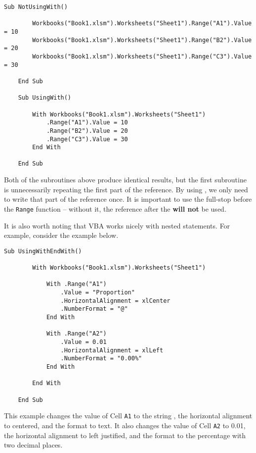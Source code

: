 \documentclass[11pt]{article}%
\begin{document}
\begin{lstlisting}[style=A]
    Sub NotUsingWith()

        Workbooks("Book1.xlsm").Worksheets("Sheet1").Range("A1").Value = 10
        Workbooks("Book1.xlsm").Worksheets("Sheet1").Range("B2").Value = 20
        Workbooks("Book1.xlsm").Worksheets("Sheet1").Range("C3").Value = 30

    End Sub

    Sub UsingWith()

        With Workbooks("Book1.xlsm").Worksheets("Sheet1")
            .Range("A1").Value = 10
            .Range("B2").Value = 20
            .Range("C3").Value = 30
        End With

    End Sub
\end{lstlisting}

Both of the subroutines above produce identical results, but the first subroutine is unnecessarily repeating the first part of the reference. By using , we only need to write that part of the reference once. It is important to use the full-stop before the \texttt{Range} function -- without it, the reference after the  \textbf{will not} be used.

It is also worth noting that VBA works nicely with nested  statements. For example, consider the example below.\\

\begin{lstlisting}[style=A]
    Sub UsingWithEndWith()

        With Workbooks("Book1.xlsm").Worksheets("Sheet1")

            With .Range("A1")
                .Value = "Proportion"
                .HorizontalAlignment = xlCenter
                .NumberFormat = "@"
            End With

            With .Range("A2")
                .Value = 0.01
                .HorizontalAlignment = xlLeft
                .NumberFormat = "0.00%"
            End With

        End With

    End Sub
\end{lstlisting}

This example changes the value of Cell \texttt{A1} to the string , the horizontal alignment to centered, and the format to text. It also changes the value of Cell \texttt{A2} to 0.01, the horizontal alignment to left justified, and the format to the percentage with two decimal places.
\end{document}
